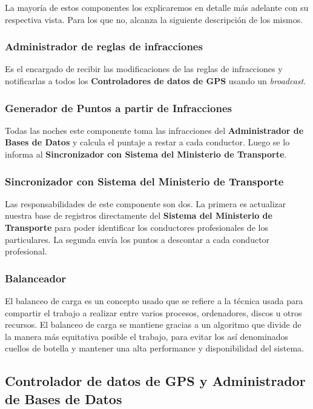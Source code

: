 La mayoría de estos componentes los explicaremos en detalle más adelante con su 
respectiva vista. Para los que no, alcanza la siguiente descripción de los 
mismos.


\subsubsection{Administrador de reglas de infracciones}

Es el encargado de recibir las modificaciones de las reglas de infracciones y 
notificarlas a todos los \textbf{Controladores de datos de GPS} usando un \textit{broadcast}.

\subsubsection{Generador de Puntos a partir de Infracciones}

Todas las noches este componente toma las infracciones del \textbf{Administrador de Bases de Datos} 
y calcula el puntaje a restar a cada conductor. Luego se lo informa al
\textbf{Sincronizador con Sistema del Ministerio de Transporte}.

\subsubsection{Sincronizador con Sistema del Ministerio de Transporte}

Las responsabilidades de este componente son dos.
La primera es actualizar nuestra base de registros directamente del \textbf{Sistema del Ministerio de Transporte}
para poder identificar los conductores profesionales de los particulares. 
La segunda envía los puntos a descontar a cada conductor profesional.

\subsubsection{Balanceador}
El balanceo de carga es un concepto usado que se refiere a la técnica usada para compartir el trabajo
a realizar entre varios procesos, ordenadores, discos u otros recursos.
El balanceo de carga se mantiene gracias a un algoritmo que divide de la manera más equitativa posible
el trabajo, para evitar los así denominados cuellos de botella y mantener una 
alta performance y disponibilidad del sistema.


\subsection{Controlador de datos de GPS y Administrador de Bases de Datos}

